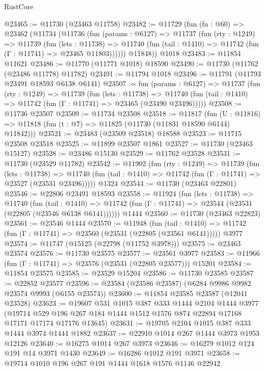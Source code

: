 \begin{lexlean}{RustCore}
\begin{coremodule}
@23465 := @11730 (@23463 @11758)
@23482 := @11729
    (fun (fn : @60) =>
    @23462
      (@11734
        (@11736
          (fun (params : @6127) =>
          @11737
            (fun (rty : @1249) =>
            @11739
              (fun (lets : @11738) =>
              @11740 (fun (tail : @1410) => @11742 (fun (Γ : @11741) => @23465 @11803))))))
        @11848))
    @1018
@23483 := @11854 @11621
@23486 := @11770 (@11771 @1018) @18590
@23490 := @11730 (@11762 (@23486 @11778) @11782)
@23491 := @11794 @1018
@23496 := @11791 (@11793 @23491 @18593 @6138 @6141)
@23507 := fun (params : @6127) =>
  @11737
    (fun (rty : @1249) =>
    @11739
      (fun (lets : @11738) =>
      @11740 (fun (tail : @1410) => @11742 (fun (Γ : @11741) => @23465 (@23490 @23496)))))
@23508 := @11736 @23507
@23509 := @11734 @23508
@23518 := @11817
    (fun (U : @11816) => @11818 (fun (t : @7) => @11825 (@11730 (@11831 @18590 @6144) @11842)))
@23521 := @23483 (@23509 @23518) @18588
@23523 := @11715 @23508 @23518
@23525 := @11899 @23507 @1861
@23527 := @11730 (@23463 @15127)
@23528 := @23486 @15130
@23529 := @11762 @23528
@23531 := @11730 (@23529 @11782)
@23542 := @11902
    (fun (rty : @1249) =>
    @11739
      (fun (lets : @11738) =>
      @11740 (fun (tail : @1410) => @11742 (fun (Γ : @11741) => @23527 (@23531 @23496)))))
    @1324
@23544 := @11730 (@23463 @22801)
@23546 := @22806 @23491 @18593
@23558 := @11924
    (fun (lets : @11738) =>
    @11740
      (fun (tail : @1410) =>
      @11742 (fun (Γ : @11741) => @23544 (@23531 (@22805 (@23546 @6138 @6141))))))
    @1444
@23560 := @11730 (@23463 @22823)
@23561 := @23546 @1444
@23570 := @11948
    (fun (tail : @1410) => @11742 (fun (Γ : @11741) => @23560 (@23531 (@22805 (@23561 @6141)))))
    @3977
@23574 := @11747 (@15125 (@22798 (@11752 @3978)))
@23575 := @23463 @23574
@23576 := @11730 @23575
@23577 := @23561 @3977
@23583 := @11966 (fun (Γ : @11741) => @23576 (@23531 (@22805 @23577))) @15201
@23584 := @11854 @23575
@23585 := @23529 @15204
@23586 := @11730 @23585
@23587 := @22852 @23577
@23596 := @23584 (@23586 @23587) (@6284 @9986 @9982 @23574 @9993 (@6155 @23574))
@23600 := @11854 @23585 @23587 (@12041 @23528)
@23623 := @19607
    @531
    @1015
    @387
    @333
    @1444
    @2104
    @1444
    @3977
    (@19714 @529 @196 @267 @184 @1444 @1512 @1576 @874 @22894 @17168 @17171 @17174 @17176 @13645)
@23631 := @19705 @2104 @1015 @387 @333 @1444 @3974 @1444 @1882
@23637 := @22910 @1014 @267 @1444 @3973 @1953 @12126
@23640 := @16275 @1014 @267 @3973
@23646 := @16279 @1012 @124 @191 @14 @3971 @1430
@23649 := @16286 @1012 @191 @3971
@23658 := @19714 @1010 @196 @267 @191 @1444 @1618 @1576 @1146 @22942

\end{coremodule}
\end{lexlean}
